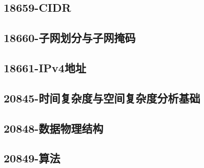 \subsection{18659-CIDR}

\subsection{18660-子网划分与子网掩码}

\subsection{18661-IPv4地址}

\subsection{20845-时间复杂度与空间复杂度分析基础}

\subsection{20848-数据物理结构}

\subsection{20849-算法}

